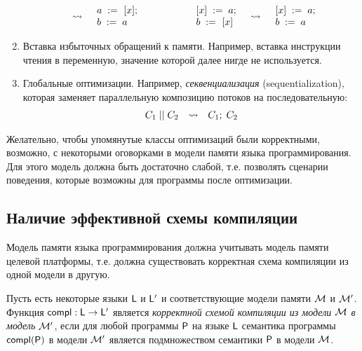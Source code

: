 \begin{enumerate}
\[\begin{array}{c c c}
\begin{array}{l c l}
        & \rightsquigarrow &
        \begin{array}{l}
        a \;:=_{}\;[x]; \\
        b\;:=\;a
        \end{array}
      \end{array}
      & \qquad &
      \begin{array}{l c l}
        \begin{array}{l}
        [x]\;:=\;a; \\
        b \;:=_{}\;[x]
        \end{array}
        & \rightsquigarrow &
        \begin{array}{l}
        [x]\;:=\;a; \\
        b\;:=\;a
        \end{array}
      \end{array}
    \end{array}
    \]
  \item Вставка избыточных обращений к памяти. Например, вставка инструкции чтения в переменную,
    значение которой далее нигде не используется.
  \item Глобальные оптимизации. Например, \emph{секвенциализация} (sequentialization),
    которая заменяет параллельную композицию потоков на последовательную:
    \[
      \begin{array}{l c l}
      C_1\;||\;C_2 & \rightsquigarrow & C_1;\;C_2
      \end{array}
    \]
\end{enumerate}

Желательно, чтобы упомянутые классы оптимизаций были корректными,
возможно, с некоторыми оговорками
в модели памяти языка программирования.
Для этого модель должна быть достаточно слабой, т.е. позволять сценарии поведения, которые
возможны для программы после оптимизации.

\subsection{Наличие эффективной схемы компиляции}
\label{sec:overview:effcompl}
Модель памяти языка программирования должна учитывать модель памяти целевой платформы,
т.е. должна существовать корректная схема компиляции из одной модели в другую.

\begin{definition}
  \label{def:complCorrectness}
Пусть есть некоторые языки $\mathsf{L}$ и $\mathsf{L'}$ и соответствующие модели памяти $\mathcal{M}$ и $\mathcal{M'}$.
Функция $\mathsf{compl} : \mathsf{L} \rightarrow \mathsf{L'}$ является \emph{корректной схемой компиляции из модели $\mathcal{M}$ в модель $\mathcal{M'}$},
если для любой программы $\mathsf{P}$ на языке $\mathsf{L}$ семантика программы $\mathsf{compl}(\mathsf{P})$ в модели $\mathcal{M'}$ является подмножеством
семантики $\mathsf{P}$ в модели $\mathcal{M}$.
\end{definition}

